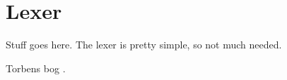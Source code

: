 \chapter{Lexer}
Stuff goes here. The lexer is pretty simple, so not much needed.

Torbens bog \cite{Mogensen10}.
